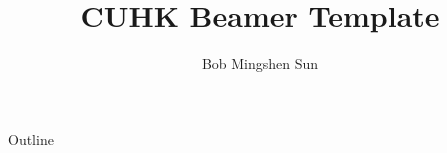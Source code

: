 

\title[CUHK]{CUHK Beamer Template}
\author[Bob]{Bob Mingshen Sun}



\begin{frame}[plain]
  \titlepage{}
\end{frame}

\begin{frame}{Outline}
  \tableofcontents{}
\end{frame}


